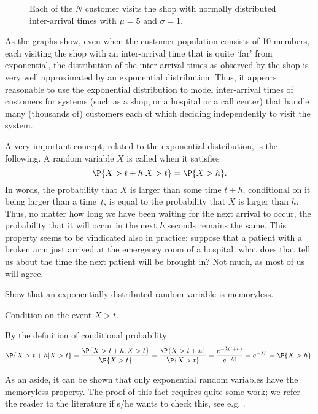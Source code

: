 \begin{figure}[ht]
  \centering
  \begin{tabular}[h]{c}
 
  \end{tabular}
  \caption{Each of the $N$ customer visits the shop with normally
    distributed inter-arrival times with $\mu=5$ and
    $\sigma=1$.}  \label{fig:normal}
\end{figure}

As the graphs show, even when the customer population consists of 10
members, each visiting the shop with an inter-arrival time that is
quite `far' from exponential, the distribution of the inter-arrival
times as observed by the shop is very well approximated by an
exponential distribution. Thus, it appears reasonable to use the
exponential distribution to model inter-arrival times of customers for systems (such as a shop, or a hospital or a call center) that handle many (thousands of)
customers each of which  deciding independently to visit the system.


A very important concept, related to the exponential distribution, is the following. A random variable $X$ is called  when it satisfies
\begin{equation*}
  \P{X > t+h | X>t} = \P{X>h}.
\end{equation*}
In words, the probability that $X$ is larger than some time $t+h$,
conditional on it being larger than a time~$t$, is equal to the
probability that $X$ is larger than $h$. Thus, no matter how long we
have been waiting for the next arrival to occur, the probability that
it will occur in the next $h$ seconds remains the same.  This property
seems to be vindicated also in practice: suppose that a patient with a
broken arm just arrived at the emergency room of a hospital, what does
that tell us about the time the next patient will be brought in? Not
much, as most of us will agree.


\begin{exercise}
  Show that an exponentially distributed random variable is
  memoryless.  
  \begin{hint}
Condition on the event ${X>t}$. 
  \end{hint}
  \begin{solution}
By  the definition of conditional probability
\begin{equation*}
  \P{X>t+h|X>t} = \frac{\P{X>t+h, X>t}}{\P{X>t}} = \frac{\P{X>t+h}}{\P{X>t}} = \frac{e^{-\lambda(t+h)}}{e^{-\lambda t}} = e^{-\lambda h} = \P{X>h}.
\end{equation*}

As an aside,  it can be shown that only exponential random variables have the
memoryless property. The proof of this fact requires quite some work;
we refer the reader to the literature if s/he wants to check this, see
e.g. \citet[Appendix 3]{yushkevich69:_markov_proces}.
  \end{solution}
\end{exercise}


